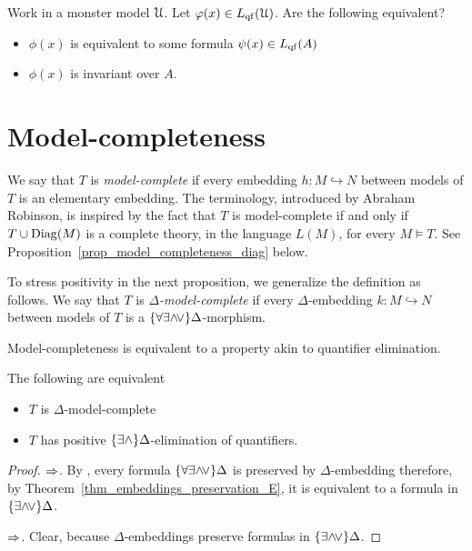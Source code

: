 \begin{exercise}\label{prop_inv_def}
  Work in a monster model $\EuScript U$.
  Let $\varphi(x)\in L_{\rm qf}(\EuScript U)$.
  Are the following equivalent?
  \begin{itemize}
   \item[1.] $\phi(x)$ is equivalent to some formula $\psi(x)\in L_{\rm qf}(A)$
   \item[2.] $\phi(x)$ is invariant over $A$.
  \end{itemize}
\end{exercise}

\section{Model-completeness}

We say that $T$ is \emph{model-complete\/} if every embedding $h:M\hookrightarrow N$ between models of $T$ is an elementary embedding.
The terminology, introduced by Abraham Robinson, is inspired by the fact that $T$ is model-complete if and only if $T\cup{\rm Diag}(M)$ is a complete theory, in the language $L(M)$, for every $M\models T$.
See Proposition~\ref{prop_model_completeness_diag} below. 

To stress positivity in the next proposition, we generalize the definition as follows. We say that $T$ is \emph{$\Delta$-model-complete\/} if every $\Delta$-embedding $k:M\hookrightarrow N$ between models of $T$ is a $\{\forall\exists{\wedge}{\!\vee}\}\Delta$-morphism. 

Model-completeness is equivalent to a property akin to quantifier elimination.

\begin{proposition}
The following are equivalent
\begin{itemize}
\item[1.] $T$ is $\Delta$-model-complete
\item[2.] $T$ has positive $\{\exists\wedge\}\Delta$-elimination of quantifiers.
\end{itemize}
\end{proposition}

\begin{proof}
$\Rightarrow$. By , every formula $\{\forall\exists{\wedge}{\!\vee}\}\Delta$ is preserved by $\Delta$-embedding therefore, by Theorem~\ref{thm_embeddings_preservation_E}, it is equivalent to a formula in $\{\exists{\wedge}{\!\vee}\}\Delta$.

$\Rightarrow$. Clear, because $\Delta$-embeddings preserve formulas in $\{\exists{\wedge}{\!\vee}\}\Delta$.
\end{proof}


